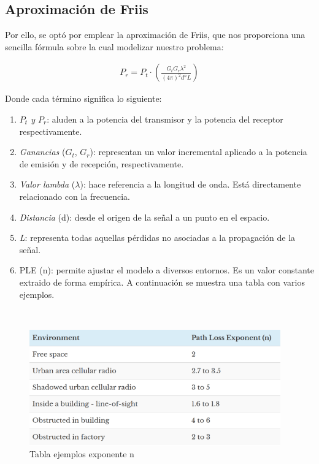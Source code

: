 \subsection{Aproximación de Friis}
\label{subsec:friis}

Por ello, se optó por emplear la aproximación de Friis, que nos proporciona una sencilla fórmula sobre la cual modelizar nuestro problema:

\begin{align}
    P_r = P_t \cdot \left( \frac{G_t G_r \lambda^2 }{(4 \pi)^2 d^n L} \right)
\end{align}

Donde cada término significa lo siguiente:

\begin{enumerate}
    \item \emph{$P_t$ y $P_r$}: aluden a la potencia del transmisor y la potencia del receptor respectivamente.

    \item \emph{Ganancias} ($G_t$, $G_r$): representan un valor incremental aplicado a la potencia de emisión y de recepción, respectivamente.
    
    \item \emph{Valor lambda} ($\lambda$): hace referencia a la longitud de onda. Está directamente relacionado con la frecuencia.
    
    \item \emph{Distancia} (d): desde el origen de la señal a un punto en el espacio.
    
    \item \emph{L}: representa todas aquellas pérdidas no asociadas a la propagación de la señal.
    
    \item \ac{PLE} (n): permite ajustar el modelo a diversos entornos. Es un valor constante extraido de forma empírica. A continuación se muestra una tabla con varios ejemplos.
\end{enumerate} \cite{friis-1}\\

\begin{figure} [H]
	\begin{center}
	\includegraphics[height=5cm]{imagenes/cap4/4_PLE_table.png}
	\end{center}
	\caption[Tabla ejemplos exponente n]{Tabla ejemplos exponente n}
	\label{fig:ple_table}
\end{figure}

